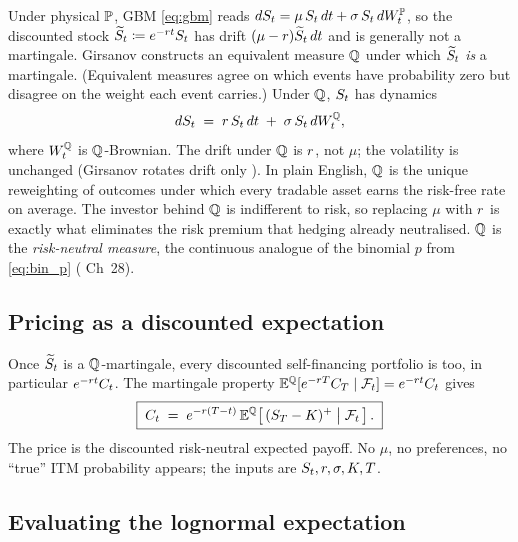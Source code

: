 Under physical $\mathbb{P}$, GBM \eqref{eq:gbm} reads
$dS_t = \mu\,S_t\,dt + \sigma\,S_t\,dW_t^{\mathbb{P}}$, so
the discounted stock $\widetilde{S}_t \coloneqq e^{-r t}S_t$
has drift $(\mu - r)\widetilde{S}_t\,dt$ and is generally
not a martingale. Girsanov constructs an equivalent measure
$\mathbb{Q}$ under which $\widetilde{S}_t$ \emph{is} a martingale.
(Equivalent measures agree on which events have probability
zero but disagree on the weight each event carries.) Under
$\mathbb{Q}$, $S_t$ has dynamics
\begin{equation}
  dS_t \;=\; r\,S_t\,dt
              \;+\; \sigma\,S_t\,dW_t^{\mathbb{Q}},
  \label{eq:gbm_Q}
\end{equation}
where $W_t^{\mathbb{Q}}$ is $\mathbb{Q}$-Brownian. The drift under $\mathbb{Q}$ is
$r$, not $\mu$; the volatility is unchanged (Girsanov rotates
drift only \citeHull{}). In plain English, $\mathbb{Q}$ is the unique
reweighting of outcomes under which every tradable asset earns
the risk-free rate on average. The investor behind $\mathbb{Q}$ is
indifferent to risk, so replacing $\mu$ with $r$ is exactly
what eliminates the risk premium that hedging already neutralised.
$\mathbb{Q}$ is the \emph{risk-neutral measure}, the continuous
analogue of the binomial $p$ from \eqref{eq:bin_p} (\citeHull{}
Ch~28).

\subsection{Pricing as a discounted expectation}
\label{subsec:ch15_pricing_expectation}

Once $\widetilde{S}_t$ is a $\mathbb{Q}$-martingale, every discounted
self-financing portfolio is too, in particular
$e^{-r t}C_t$. The martingale property
$\mathbb{E}^{\mathbb{Q}}[e^{-rT}C_T \mid \mathcal F_t] =
e^{-r t}C_t$ gives
\begin{equation}
  \boxed{\;
    C_t \;=\; e^{-r(T - t)}\,
                  \mathbb{E}^{\mathbb{Q}}\!\left[\,(S_T - K)^+
                                  \;\big|\; \mathcal F_t\,\right].
  \;}
  \label{eq:risk_neutral_pricing}
\end{equation}
The price is the discounted risk-neutral expected payoff. No
$\mu$, no preferences, no ``true'' ITM probability appears; the
inputs are $S_t, r, \sigma, K, T$.

\subsection{Evaluating the lognormal expectation}
\label{subsec:ch15_lognormal_eval}


